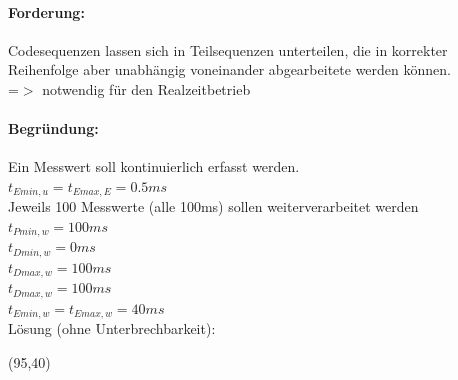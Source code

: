\documentclass[12pt,a4paper,oneside,ngerman]{article}
\begin{document}
\paragraph{Forderung:}
Codesequenzen lassen sich in Teilsequenzen unterteilen, die in korrekter Reihenfolge aber unabhängig voneinander abgearbeitete werden können. \\
=$>$ notwendig für den Realzeitbetrieb

\paragraph{Begründung:}
Ein Messwert soll kontinuierlich erfasst werden. \\
\(t_{Emin,u} = t_{Emax,E} = 0.5ms\) \\
Jeweils 100 Messwerte (alle 100ms) sollen weiterverarbeitet werden \\
\(t_{Pmin,w} = 100ms\) \\
\(t_{Dmin,w} = 0ms\) \\
\(t_{Dmax,w} = 100ms\) \\
\(t_{Dmax,w} = 100ms\) \\ 
\(t_{Emin,w} = t_{Emax,w} = 40ms\) \\

Lösung (ohne Unterbrechbarkeit):\\
\begin{struktogramm}(95,40)
		\whileend
	\whileend
\end{struktogramm}

\end{document}
